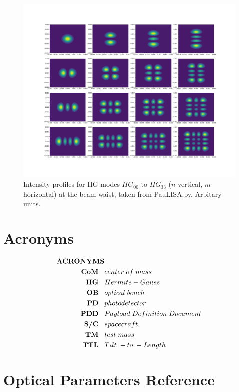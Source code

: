 \documentclass[aps,twoside,secnumarabic,balancelastpage,amsmath,amssymb,nofootinbib,hyperref=pdftex]{revtex4}
\newcommand\tab[1][3mm]{\hspace*{#1}}
\begin{document}
\begin{figure}[h] 
\centering\includegraphics[width=\linewidth]{intensity-plots}
\caption{Intensity profiles for HG modes $HG_{00}$ to $HG_{33}$ ($n$ vertical, $m$ horizontal) at the beam waist, taken from PauLISA.py. Arbitary units.}
\label{fig:A1}
\end{figure}

\newpage
\section{Acronyms}
\begin{align*}
\textbf{ACRONYMS}&\\
\textbf{CoM}\tab& center\; of\; mass\\
\textbf{HG}\tab &Hermite-Gauss\\
\textbf{OB}\tab &optical\;bench\\
\textbf{PD}\tab &photodetector\\
\textbf{PDD}\tab &Payload\; Definition\; Document\\
\textbf{S/C}\tab &spacecraft\\
\textbf{TM}\tab &test\; mass\\
\textbf{TTL}\tab &Tilt\;-to\;-Length\\
\end{align*}

\newpage
\section{Optical Parameters Reference}
\end{document}
